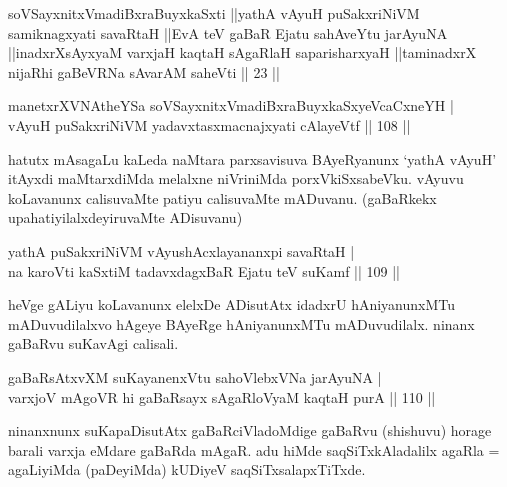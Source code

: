 \begin{kandikeshl}
soVSayxnitxVmadiBxraBuyxkaSxti ||yathA vAyuH puSakxriNiVM samiknagxyati savaRtaH ||EvA teV gaBaR Ejatu sahAveYtu jarAyuNA ||inadxrXsAyxyaM varxjaH kaqtaH sAgaRlaH saparisharxyaH ||taminadxrX nijaRhi gaBeVRNa sAvarAM saheVti || 23 ||
\end{kandikeshl}


\begin{shl}
manetxrXVNAtheYSa soVSayxnitxVmadiBxraBuyxkaSxyeVcaCxneYH | \\
vAyuH puSakxriNiVM yadavxtasxmacnajxyati cAlayeVtf \hfill|| 108 || 
\end{shl}

\begin{artha}
hatutx mAsagaLu kaLeda naMtara parxsavisuva BAyeRyanunx `yathA vAyuH' 
itAyxdi maMtarxdiMda melalxne niVriniMda porxVkiSxsabeVku. vAyuvu 
koLavanunx calisuvaMte patiyu calisuvaMte mADuvanu. (gaBaRkekx 
upahatiyilalxdeyiruvaMte ADisuvanu)
\end{artha}


\begin{shl}
yathA puSakxriNiVM vAyushAcxlayananxpi savaRtaH | \\
na karoVti kaSxtiM tadavxdagxBaR Ejatu teV suKamf \hfill|| 109 || 
\end{shl}

\begin{artha}
heVge gALiyu koLavanunx elelxDe ADisutAtx idadxrU hAniyanunxMTu 
mADuvudilalxvo hAgeye BAyeRge hAniyanunxMTu mADuvudilalx. ninanx 
gaBaRvu suKavAgi calisali.
\end{artha}

\begin{shl}
gaBaRsAtxvXM suKayanenxVtu sahoVlebxVNa jarAyuNA | \\
varxjoV mAgoVR hi gaBaRsayx sAgaRloV\s yaM kaqtaH purA \hfill|| 110 || 
\end{shl}

\begin{artha}
ninanxnunx suKapaDisutAtx gaBaRciVladoMdige gaBaRvu (shishuvu) horage 
barali varxja eMdare gaBaRda mAgaR. adu hiMde saqSiTxkAladalilx agaRla 
= agaLiyiMda (paDeyiMda) kUDiyeV saqSiTxsalapxTiTxde.
\end{artha}

